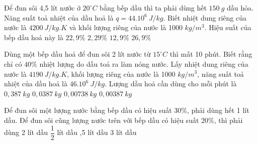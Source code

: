\begin{vidu}
	Để đun sôi 4,5 lít nước ở $20^\circ C$ bằng bếp dầu thì ta phải dùng hết $150\ g$ dầu hỏa. Năng suất toả nhiệt của dầu hoả là $q=44.10^{6}\ J/kg$. Biết nhiệt dung riêng của nước là $4200\ J/kg.K$ và khối lượng riêng của nước là 1000 $kg/m^3$. Hiệu suất của bếp dầu hoả này là
	\choice
	{\True $22,9 \%$}
	{$2,29 \%$}
	{$12,9 \%$}
	{$26,9 \%$}
	\end{vidu}
\begin{vidu}
	Dùng một bếp dầu hoả để đun sôi 2 lít nước từ $15^\circ C$ thì mất 10 phút. Biết rằng chỉ có $40 \%$ nhiệt lượng do dầu toả ra làm nóng nước. Lấy nhiệt dung riêng của nước là $4190\ J/kg. K$, khối lượng riêng của nước là 1000 $kg/m^3$, năng suất toả nhiệt của dầu hoả là $46 . 10^{6}\ J/kg$. Lượng dầu hoả cần dùng cho mỗi phút là
	\choice
	{$0,387\ kg$}
	{$0,0387\ kg$}
	{$0,00738\ kg$}
	{\True $0,00387\ kg$}
	\end{vidu}
\begin{vidu}
	Để đun sôi một lượng nước bằng bếp dầu có hiệu suất 30\%, phải dùng hết 1 lít dầu. Để đun sôi cũng lượng nước trên với bếp dầu có hiệu suất $20 \%$, thì phải dùng
	\choice
	{2 lít dầu}
	{$\dfrac{1}{2}$ lít dầu}
	{,5 lít dầu}
	{3 lít dầu}
	\end{vidu}

